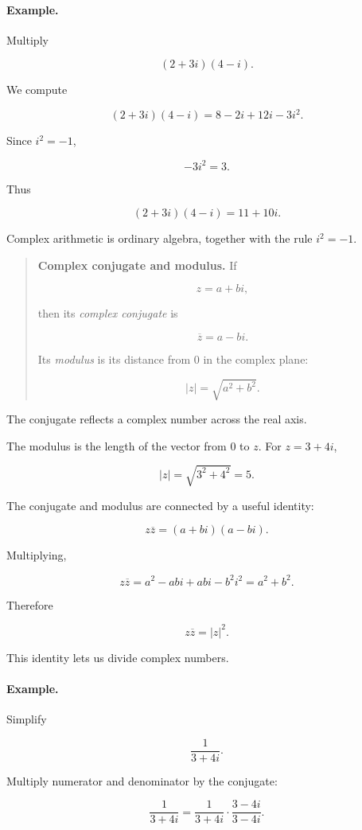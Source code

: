 \paragraph{Example.}
Multiply

\[
(2+3i)(4-i).
\]

We compute

\[
(2+3i)(4-i)
=
8-2i+12i-3i^2.
\]

Since \(i^2=-1\),

\[
-3i^2=3.
\]

Thus

\[
(2+3i)(4-i)=11+10i.
\]

Complex arithmetic is ordinary algebra, together with the rule \(i^2=-1\).

\begin{quote}
\textbf{Complex conjugate and modulus.}
If

\[
z=a+bi,
\]

then its \emph{complex conjugate} is

\[
\boxed{\overline{z}=a-bi.}
\]

Its \emph{modulus} is its distance from \(0\) in the complex plane:

\[
\boxed{|z|=\sqrt{a^2+b^2}.}
\]
\end{quote}

The conjugate reflects a complex number across the real axis.

The modulus is the length of the vector from \(0\) to \(z\).  For \(z=3+4i\),

\[
|z|=\sqrt{3^2+4^2}=5.
\]

The conjugate and modulus are connected by a useful identity:

\[
z\overline{z}=(a+bi)(a-bi).
\]

Multiplying,

\[
z\overline{z}
=
a^2-ab i+ab i-b^2 i^2
=
a^2+b^2.
\]

Therefore

\[
\boxed{
z\overline{z}=|z|^2.
}
\]

This identity lets us divide complex numbers.

\paragraph{Example.}
Simplify

\[
\frac{1}{3+4i}.
\]

Multiply numerator and denominator by the conjugate:

\[
\frac{1}{3+4i}
=
\frac{1}{3+4i}\cdot\frac{3-4i}{3-4i}.
\]

